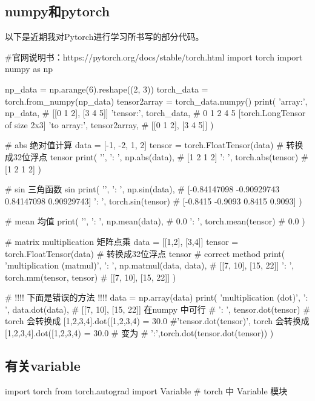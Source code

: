\documentclass{article}
\begin{document}
	\subsection{numpy和pytorch}
	以下是近期我对Pytorch进行学习所书写的部分代码。
	\begin{python}
		#官网说明书：https://pytorch.org/docs/stable/torch.html
		import torch
		import numpy as np
		
		np_data = np.arange(6).reshape((2, 3))
		torch_data = torch.from_numpy(np_data)
		tensor2array = torch_data.numpy()
		print(
		'\nnumpy array:', np_data,          # [[0 1 2], [3 4 5]]
		'\ntorch tensor:', torch_data,      #  0  1  2   4  5    [torch.LongTensor of size 2x3]
		'\ntensor to array:', tensor2array, # [[0 1 2], [3 4 5]]
		)
		
		# abs 绝对值计算
		data = [-1, -2, 1, 2]
		tensor = torch.FloatTensor(data)  # 转换成32位浮点 tensor
		print(
		'\nabs',
		'\nnumpy: ', np.abs(data),          # [1 2 1 2]
		'\ntorch: ', torch.abs(tensor)      # [1 2 1 2]
		)
		
		# sin   三角函数 sin
		print(
		'\nsin',
		'\nnumpy: ', np.sin(data),      # [-0.84147098 -0.90929743  0.84147098  0.90929743]
		'\ntorch: ', torch.sin(tensor)  # [-0.8415 -0.9093  0.8415  0.9093]
		)
		
		# mean  均值
		print(
		'\nmean',
		'\nnumpy: ', np.mean(data),         # 0.0
		'\ntorch: ', torch.mean(tensor)     # 0.0
		)
		
		# matrix multiplication 矩阵点乘
		data = [[1,2], [3,4]]
		tensor = torch.FloatTensor(data)  # 转换成32位浮点 tensor
		# correct method
		print(
		'\nmatrix multiplication (matmul)',
		'\nnumpy: ', np.matmul(data, data),     # [[7, 10], [15, 22]]
		'\ntorch: ', torch.mm(tensor, tensor)   # [[7, 10], [15, 22]]
		)
		
		# !!!!  下面是错误的方法 !!!!
		data = np.array(data)
		print(
		'\nmatrix multiplication (dot)',
		'\nnumpy: ', data.dot(data),        # [[7, 10], [15, 22]] 在numpy 中可行
		# '\ntorch: ', tensor.dot(tensor)     # torch 会转换成 [1,2,3,4].dot([1,2,3,4) = 30.0
		#'tensor.dot(tensor)',      torch 会转换成 [1,2,3,4].dot([1,2,3,4) = 30.0
		# 变为
		# '\ntorch:',torch.dot(tensor.dot(tensor))
		)
		\subsection{有关variable}
		\begin{python}
			import torch
			from torch.autograd import Variable # torch 中 Variable 模块
			

\end{python}
\end{python}
\end{document}
